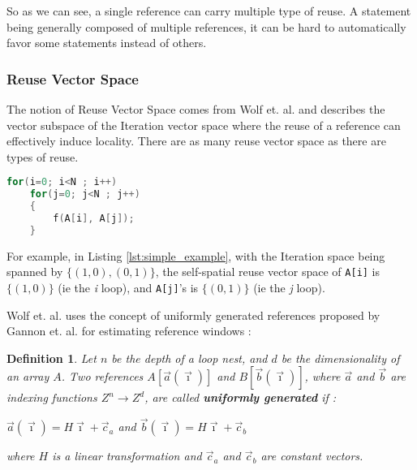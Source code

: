 \documentclass[paper=a4, fontsize=11.5pt]{scrartcl}
\newtheorem{defn}{Definition}[section]
\numberwithin{equation}{section}        %
\numberwithin{figure}{section}          %
\numberwithin{table}{section}               %
\begin{document}
                So as we can see, a single reference can carry multiple type of reuse.
                A statement being generally composed of multiple references, it 
                can be hard to automatically favor some statements instead of others.
        \subsubsection{Reuse Vector Space}
        \label{sec:wolf_91}
            The notion of Reuse Vector Space comes from Wolf et. al.\cite{Wolf'91} and describes
            the vector subspace of the Iteration vector space where the reuse of
            a reference can effectively induce locality.
            There are as many reuse vector space as there are types of reuse.

\begin{lstlisting}[frame=single, language=C, caption=Simple example, label={lst:simple_example}]
for(i=0; i<N ; i++)
    for(j=0; j<N ; j++)
    {
        f(A[i], A[j]);
    }
\end{lstlisting}

            For example, in Listing \ref{lst:simple_example}, with the Iteration
            space being spanned by $\{(1,0),(0,1)\}$, the self-spatial reuse vector space of
            \verb'A[i]' is $\{(1,0)\}$ (ie the {\it i} loop), and \verb'A[j]''s is $\{(0,1)\}$
            (ie the {\it j} loop).

            Wolf et. al. uses the concept of uniformly generated references proposed
            by Gannon et. al.\cite{Gannon:1988:SCL:50454.50460} for estimating reference
            windows :
            \begin{defn}
            \label{sec:uniformly_generated}
                Let $n$ be the depth of a loop nest, and $d$ be the dimensionality of
                an array $A$. Two references $A[\vec{a}(\vec{\imath})]$ and
                $B[\vec{b}(\vec{\imath})]$, where $\vec{a}$ and $\vec{b}$ are indexing
                functions $Z^{n} \rightarrow Z^{d}$, are called \textbf{uniformly generated} if :
                \begin{center}
                    $\vec{a}(\vec{\imath}) = H\vec{\imath}+\vec{c}_a$ and $\vec{b}(\vec{\imath}) = H\vec{\imath}+\vec{c}_b$
                \end{center}
                where $H$ is a linear transformation and $\vec{c}_a$ and $\vec{c}_b$ are constant vectors.
            \end{defn}
            
\end{document}
